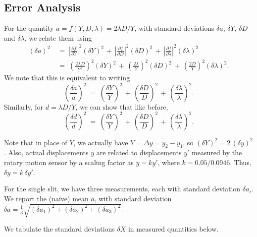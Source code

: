 \documentclass[11pt]{article}
\newcommand\pp[2]{\frac{\partial #1}{\partial #2}}
\begin{document}
        \subsection{Error Analysis}
        For the quantity $a = f(Y, D, \lambda) = 2\lambda D/Y$, with standard deviations $\delta a$, $\delta Y$, $\delta D$ and $\delta \lambda$,
        we relate them using
        \begin{align*}
                (\delta a)^2 \;&=\; \left|\pp{f}{Y}\right|^2(\delta Y)^2 \,+\, 
                                        \left|\pp{f}{D}\right|^2(\delta D)^2 \,+\,
                                        \left|\pp{f}{\lambda}\right|^2(\delta \lambda)^2 \\
                        \;&=\; \left(\frac{2\lambda D}{Y^2}\right)^2(\delta Y)^2 \,+\, \left(\frac{2\lambda}{Y}\right)^2(\delta D)^2 \,+\,
                                \left(\frac{2D}{Y}\right)^2(\delta \lambda)^2.
        \end{align*}
        We note that this is equivalent to writing
        \[
                \left( \frac{\delta a}{a} \right)^2 \;=\; \left( \frac{\delta Y}{Y} \right)^2  \,+\, \left( \frac{\delta D}{D} \right)^2 \,+\,
                                \left( \frac{\delta \lambda}{\lambda} \right)^2 .
        \]
        Similarly, for $d = \lambda D/Y$, we can show that like before,
        \[
                \left( \frac{\delta d}{d} \right)^2 \;=\; \left( \frac{\delta Y}{Y} \right)^2  \,+\, \left( \frac{\delta D}{D} \right)^2 \,+\,
                                \left( \frac{\delta \lambda}{\lambda} \right)^2 .
        \]

        Note that in place of $Y$, we actually have $Y = \Delta y = y_2 - y_1$, so $(\delta Y)^2 = 2\, (\delta y)^2$.
        Also, actual displacements $y$ are related to displacements $y'$ measured by the rotary motion sensor by a scaling factor as $y = k y'$,
        where $k = 0.05 /0.0946$. Thus, $\delta y = k \,\delta y'$.

        For the single slit, we have three measurements, each with standard deviation $\delta a_i$.
        We report the (na\"ive) mean $\bar{a}$, with standard deviation $\delta a = \frac{1}{3}\sqrt{(\delta a_1)^2 + (\delta a_2)^2 + (\delta a_3)^2}$.

        We tabulate the standard deviations $\delta X$ in measured quantities below.
        
\end{document}
